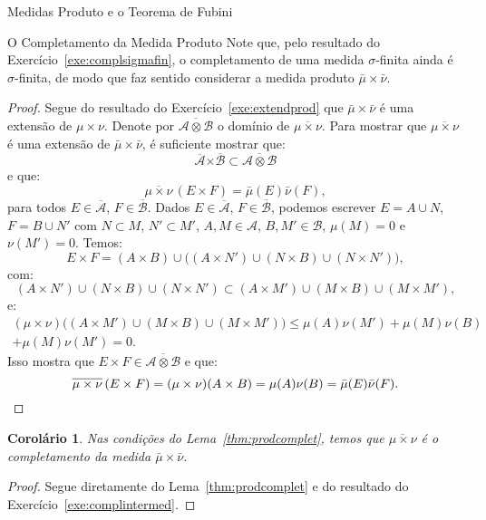 \documentclass[oneside,final,11pt]{amsbook}
\newcommand{\Times}{\pmb{\times}}
\theoremstyle{remark}\newtheorem{exercise}{Exercício}[chapter]
\theoremstyle{remark}\newtheorem{*exercise}[exercise]{\hbox to 0pt{\hskip 0pt minus 1fil*}Exercício}
\theoremstyle{definition}\newtheorem{exdefin}{Definição}[chapter]
\theoremstyle{plain}\newtheorem{teo}{Teorema}[section]
\theoremstyle{plain}\newtheorem{lem}[teo]{Lema}
\theoremstyle{plain}\newtheorem{prop}[teo]{Proposição}
\theoremstyle{plain}\newtheorem{cor}[teo]{Corolário}
\theoremstyle{definition}\newtheorem{defin}[teo]{Definição}
\theoremstyle{remark}\newtheorem{rem}[teo]{Observação}
\theoremstyle{definition}\newtheorem{notation}[teo]{Notação}
\theoremstyle{definition}\newtheorem{convention}[teo]{Convenção}
\theoremstyle{definition}\newtheorem{example}[teo]{Exemplo}
\numberwithin{section}{chapter}
\numberwithin{equation}{section}
\begin{document}
\begin{chapter}{Medidas Produto e o Teorema de Fubini}
\begin{section}{O Completamento da Medida Produto}
Note que, pelo resultado do Exercício~\ref{exe:complsigmafin}, o completamento
de uma medida $\sigma$-finita ainda é $\sigma$-finita, de modo que faz sentido
considerar a medida produto $\bar\mu\times\bar\nu$.

\begin{proof}
Segue do resultado do Exercício~\ref{exe:extendprod} que $\bar\mu\times\bar\nu$
é uma extensão de $\mu\times\nu$. Denote por $\overline{\mathcal A\otimes\mathcal B}$
o domínio de $\overline{\mu\times\nu}$. Para mostrar que $\overline{\mu\times\nu}$
é uma extensão de $\bar\mu\times\bar\nu$, é suficiente mostrar que:
\[\overline{\mathcal A}\Times\overline{\mathcal B}\subset\overline{\mathcal A\otimes\mathcal B}\]
e que:
\[\overline{\mu\times\nu}\,(E\times F)=\bar\mu(E)\bar\nu(F),\]
para todos $E\in\overline{\mathcal A}$, $F\in\overline{\mathcal B}$.
Dados $E\in\overline{\mathcal A}$, $F\in\overline{\mathcal B}$, podemos escrever
$E=A\cup N$, $F=B\cup N'$ com $N\subset M$, $N'\subset M'$, $A,M\in\mathcal A$,
$B,M'\in\mathcal B$, $\mu(M)=0$ e $\nu(M')=0$. Temos:
\[E\times F=(A\times B)\cup\big((A\times N')\cup(N\times B)\cup(N\times N')\big),\]
com:
\[(A\times N')\cup(N\times B)\cup(N\times N')\subset
(A\times M')\cup(M\times B)\cup(M\times M'),\]
e:
\begin{multline*}
(\mu\times\nu)\big((A\times M')\cup(M\times B)\cup(M\times M')\big)
\le\mu(A)\nu(M')+\mu(M)\nu(B)\\+\mu(M)\nu(M')=0.
\end{multline*}
Isso mostra que $E\times F\in\overline{\mathcal A\otimes\mathcal B}$ e que:
\[\overline{\mu\times\nu}\,(E\times F)=(\mu\times\nu)(A\times B)=\mu(A)\nu(B)
=\bar\mu(E)\bar\nu(F).\qedhere\]
\end{proof}

\begin{cor}
Nas condições do Lema~\ref{thm:prodcomplet}, temos que $\overline{\mu\times\nu}$ é o completamento
da medida $\bar\mu\times\bar\nu$.
\end{cor}
\begin{proof}
Segue diretamente do Lema~\ref{thm:prodcomplet} e do resultado do Exercício~\ref{exe:complintermed}.
\end{proof}


\end{section}
\end{chapter}
\end{document}
